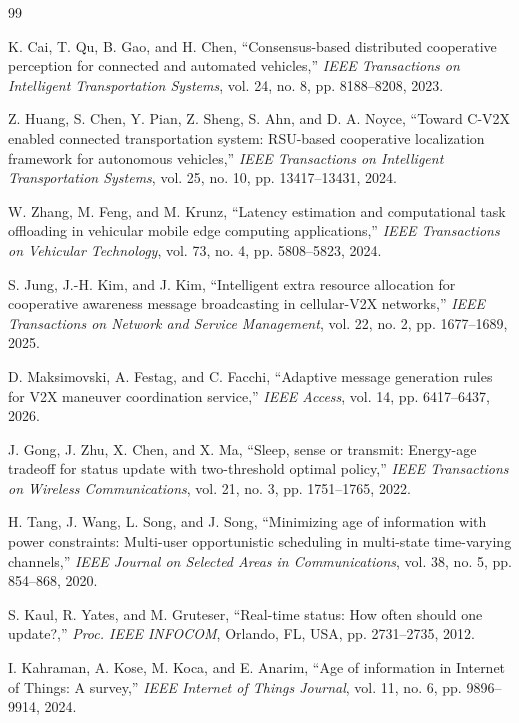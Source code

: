 \documentclass[journal]{IEEEtran}
\begin{document}
\begin{thebibliography}{99}

 K. Cai, T. Qu, B. Gao, and H. Chen, ``Consensus-based distributed cooperative perception for connected and automated vehicles,'' \emph{IEEE Transactions on Intelligent Transportation Systems}, vol. 24, no. 8, pp. 8188--8208, 2023.

 Z. Huang, S. Chen, Y. Pian, Z. Sheng, S. Ahn, and D. A. Noyce, ``Toward C-V2X enabled connected transportation system: RSU-based cooperative localization framework for autonomous vehicles,'' \emph{IEEE Transactions on Intelligent Transportation Systems}, vol. 25, no. 10, pp. 13417--13431, 2024.

 W. Zhang, M. Feng, and M. Krunz, ``Latency estimation and computational task offloading in vehicular mobile edge computing applications,'' \emph{IEEE Transactions on Vehicular Technology}, vol. 73, no. 4, pp. 5808--5823, 2024.

 S. Jung, J.-H. Kim, and J. Kim, ``Intelligent extra resource allocation for cooperative awareness message broadcasting in cellular-V2X networks,'' \emph{IEEE Transactions on Network and Service Management}, vol. 22, no. 2, pp. 1677--1689, 2025.

 D. Maksimovski, A. Festag, and C. Facchi, ``Adaptive message generation rules for V2X maneuver coordination service,'' \emph{IEEE Access}, vol. 14, pp. 6417--6437, 2026.

 J. Gong, J. Zhu, X. Chen, and X. Ma, ``Sleep, sense or transmit: Energy-age tradeoff for status update with two-threshold optimal policy,'' \emph{IEEE Transactions on Wireless Communications}, vol. 21, no. 3, pp. 1751--1765, 2022.

 H. Tang, J. Wang, L. Song, and J. Song, ``Minimizing age of information with power constraints: Multi-user opportunistic scheduling in multi-state time-varying channels,'' \emph{IEEE Journal on Selected Areas in Communications}, vol. 38, no. 5, pp. 854--868, 2020.

 S. Kaul, R. Yates, and M. Gruteser, ``Real-time status: How often should one update?,'' \emph{Proc. IEEE INFOCOM}, Orlando, FL, USA, pp. 2731--2735, 2012.

 I. Kahraman, A. Kose, M. Koca, and E. Anarim, ``Age of information in Internet of Things: A survey,'' \emph{IEEE Internet of Things Journal}, vol. 11, no. 6, pp. 9896--9914, 2024.


\end{thebibliography}
\end{document}
